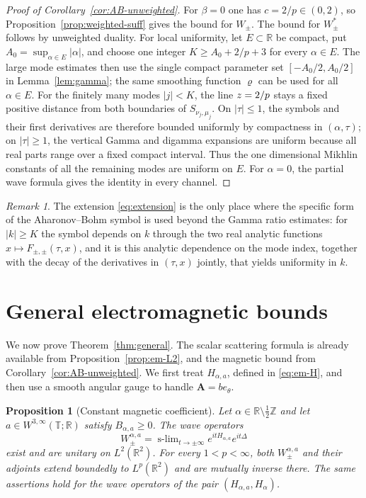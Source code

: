 \documentclass[11pt,a4paper,reqno,backref=page]{amsart}
\newcommand{\R}{\mathbb R}
\newcommand{\Z}{\mathbb Z}
\newcommand{\T}{\mathbb T}
\DeclareMathOperator*{\slim}{s\text{-}lim}
\let\Re\relax\DeclareMathOperator{\Re}{Re}
\numberwithin{equation}{section}
\newtheorem{proposition}[theorem]{Proposition}
\theoremstyle{definition}
\theoremstyle{remark}
\newtheorem{remark}[theorem]{Remark}
\begin{document}
\begin{proof}[Proof of
Corollary~\ref{cor:AB-unweighted}]
For $\beta=0$ one has $c=2/p\in(0,2)$, so
Proposition~\ref{prop:weighted-suff} gives the bound for
$W_\pm$. The bound for $W_\pm^*$ follows by unweighted duality.
For local uniformity, let $E\subset\R$ be compact, put
$A_0=\sup_{\alpha\in E}|\alpha|$, and choose one integer $K\ge
A_0+2/p+3$ for every $\alpha\in E$. The large mode estimates
then use the single compact parameter set $[-A_0/2,A_0/2]$ in
Lemma~\ref{lem:gamma}; the same smoothing function $\varrho$ can
be used for all $\alpha\in E$. For the finitely many modes
$|j|<K$, the line $\Re z=2/p$ stays a fixed positive distance
from both boundaries of $S_{\nu_j,\mu_j}$. On $|\tau|\le1$, the
symbols and their first derivatives are therefore bounded
uniformly by compactness in $(\alpha,\tau)$; on $|\tau|\ge1$,
the vertical Gamma and digamma expansions are uniform because
all real parts range over a fixed compact interval. Thus the one
dimensional Mikhlin constants of all the remaining modes are
uniform on $E$.
For $\alpha=0$, the partial wave formula gives the identity
in every channel.
\end{proof}

\begin{remark}
The extension \eqref{eq:extension} is the only place where the
specific form of the Aharonov--Bohm symbol is used beyond the
Gamma ratio estimates: for $|k|\ge K$ the symbol depends on $k$
through the two real analytic functions $x\mapsto
F_{\pm,\pm}(\tau,x)$, and it is this analytic dependence on the
mode index, together with the decay of the derivatives in
$(\tau,x)$ jointly, that yields uniformity in $k$.
\end{remark}


\section{General electromagnetic bounds}
\label{sec:electromagnetic}


We now prove Theorem~\ref{thm:general}. The scalar scattering
formula is already available from
Proposition~\ref{prop:em-L2}, and the magnetic bound from
Corollary~\ref{cor:AB-unweighted}. We first treat
$H_{\alpha,a}$, defined in \eqref{eq:em-H}, and then use a
smooth angular gauge to handle $\mathbf A=b e_\theta$.

\begin{proposition}[Constant magnetic coefficient]
\label{prop:em-wave}
  Let $\alpha\in\R\setminus\frac12\Z$ and let
  $a\in W^{3,\infty}(\T;\R)$ satisfy $B_{\alpha,a}\ge0$.
  The wave operators
  \begin{equation}\label{eq:em-wave}
    W_\pm^{\alpha,a}
    =\slim_{t\to\pm\infty}e^{itH_{\alpha,a}}e^{it\Delta}
  \end{equation}
  exist and are unitary on $L^2(\R^2)$. For every
  $1<p<\infty$, both $W_\pm^{\alpha,a}$ and their
  adjoints extend boundedly to $L^p(\R^2)$ and are mutually
  inverse there. The same assertions hold for the wave
  operators of the pair $(H_{\alpha,a},H_\alpha)$.
\end{proposition}
\end{document}
